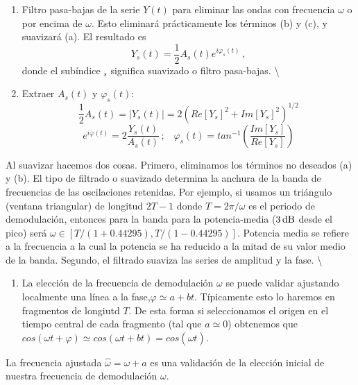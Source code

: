 \documentclass[
]{agujournal2019}
\providecommand{\tightlist}{%
  \setlength{\itemsep}{0pt}\setlength{\parskip}{0pt}}\usepackage{longtable,booktabs,array}
\begin{document}
\begin{enumerate}
\def\labelenumi{(\arabic{enumi})}
\setcounter{enumi}{1}
\item
  Filtro pasa-bajas de la serie \(Y(t)\) para eliminar las ondas con
  frecuencia \(\omega\) o por encima de \(\omega\). Esto eliminará
  prácticamente los términos (b) y (c), y suavizará (a). El resultado es
  \[Y_s(t)=\frac{1}{2}A_s(t)e^{i\varphi_s(t)}\,,\] donde el subíndice
  \(_s\) significa suavizado o filtro pasa-bajas. \textbackslash{}
\item
  Extraer \(A_s(t)\) y \(\varphi_s(t)\):
  \[\frac{1}{2}A_s(t)=|Y_s(t)|=2\left( Re[Y_s]^2 + Im[Y_s]^2\right)^{1/2}\]
  \[e^{i\varphi(t)}=2\frac{Y_s(t)}{A_s(t)}\,;\,\,\,\,\,\varphi_s(t)=tan^{-1}\left(\frac{Im[Y_s]}{Re[Y_s]}\right)\]
\end{enumerate}

Al suavizar hacemos dos cosas. Primero, eliminamos los términos no
deseados (a) y (b). El tipo de filtrado o suavizado determina la anchura
de la banda de frecuencias de las oscilaciones retenidas. Por ejemplo,
si usamos un triángulo (ventana triangular) de longitud \(2T-1\) donde
\(T=2\pi/\omega\) es el periodo de demodulación, entonces para la banda
para la potencia-media (\(3\,{\rm dB}\) desde el pico) será
\(\omega \in [T/(1+0.44295),T/(1-0.44295)]\). Potencia media se refiere
a la frecuencia a la cual la potencia se ha reducido a la mitad de su
valor medio de la banda. Segundo, el filtrado suaviza las series de
amplitud y la fase. \textbackslash{}

\begin{enumerate}
\def\labelenumi{(\arabic{enumi})}
\setcounter{enumi}{3}
\tightlist
\item
  La elección de la frecuencia de demodulación \(\omega\) se puede
  validar ajustando localmente una línea a la
  fase,\(\varphi\simeq a + bt\). Típicamente esto lo haremos en
  fragmentos de longiutd \(T\). De esta forma si seleccionamos el origen
  en el tiempo central de cada fragmento (tal que \(a\simeq 0\))
  obtenemos que
  \(cos(\omega t + \varphi)\simeq cos(\omega t + bt)=cos(\hat{\omega} t)\).
\end{enumerate}

La frecuencia ajustada \(\hat{\omega}=\omega + a\) es una validación de
la elección inicial de nuestra frecuencia de demodulación \(\omega\).

\begin{center}
\end{center}
\end{document}
